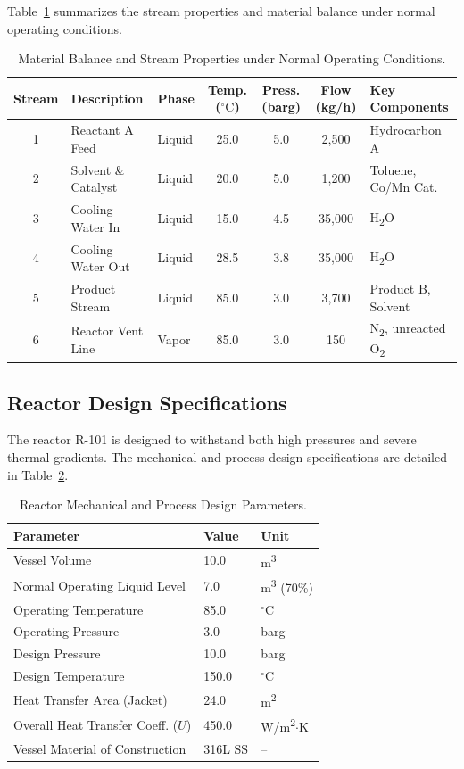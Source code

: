 Table~\ref{tab:material_balance} summarizes the stream properties and material balance under normal operating conditions.

\begin{table}[htbp]
\centering
\caption{Material Balance and Stream Properties under Normal Operating Conditions.}
\label{tab:material_balance}
\small
\begin{tabularx}{\textwidth}{cllcccX}
\toprule
\textbf{Stream} & \textbf{Description} & \textbf{Phase} & \textbf{Temp. ($^\circ\text{C}$)} & \textbf{Press. (barg)} & \textbf{Flow (kg/h)} & \textbf{Key Components} \\
\midrule
1 & Reactant A Feed & Liquid & 25.0 & 5.0 & 2,500 & Hydrocarbon A \\
2 & Solvent \& Catalyst & Liquid & 20.0 & 5.0 & 1,200 & Toluene, Co/Mn Cat. \\
3 & Cooling Water In & Liquid & 15.0 & 4.5 & 35,000 & H\textsubscript{2}O \\
4 & Cooling Water Out & Liquid & 28.5 & 3.8 & 35,000 & H\textsubscript{2}O \\
5 & Product Stream & Liquid & 85.0 & 3.0 & 3,700 & Product B, Solvent \\
6 & Reactor Vent Line & Vapor & 85.0 & 3.0 & 150 & N\textsubscript{2}, unreacted O\textsubscript{2} \\
\bottomrule
\end{tabularx}
\end{table}

\subsection{Reactor Design Specifications}
The reactor R-101 is designed to withstand both high pressures and severe thermal gradients. The mechanical and process design specifications are detailed in Table~\ref{tab:reactor_specs}.

\begin{table}[htbp]
\centering
\caption{Reactor Mechanical and Process Design Parameters.}
\label{tab:reactor_specs}
\label{tab:reactor_specs}
\small
\begin{tabularx}{0.85\textwidth}{Xll}
\toprule
\textbf{Parameter} & \textbf{Value} & \textbf{Unit} \\
\midrule
Vessel Volume & 10.0 & m\textsuperscript{3} \\
Normal Operating Liquid Level & 7.0 & m\textsuperscript{3} (70\%) \\
Operating Temperature & 85.0 & $^\circ\text{C}$ \\
Operating Pressure & 3.0 & barg \\
Design Pressure & 10.0 & barg \\
Design Temperature & 150.0 & $^\circ\text{C}$ \\
Heat Transfer Area (Jacket) & 24.0 & m\textsuperscript{2} \\
Overall Heat Transfer Coeff. ($U$) & 450.0 & W/m\textsuperscript{2}$\cdot$K \\
Vessel Material of Construction & 316L SS & -- \\
\bottomrule
\end{tabularx}
\end{table}
